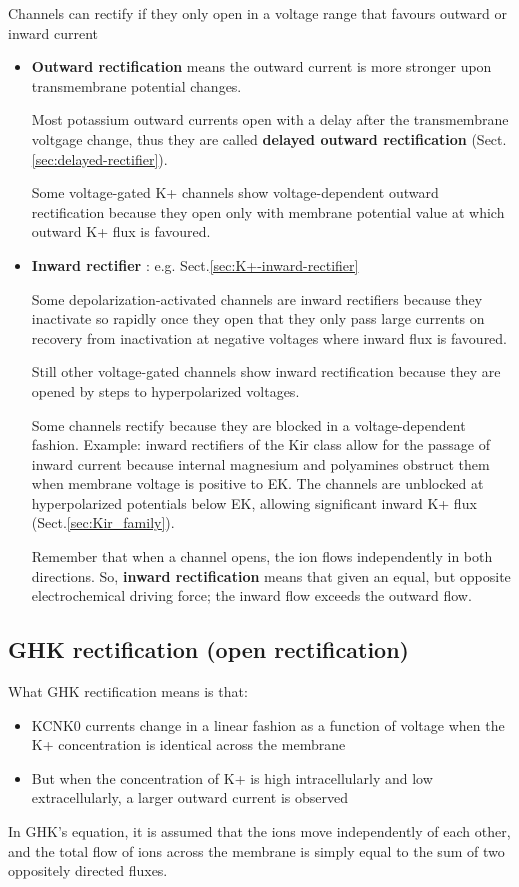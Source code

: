 Channels can rectify if they only open in a voltage range that favours outward
or inward current
\begin{itemize}

  \item {\bf Outward rectification} means the outward current is more stronger
  upon transmembrane potential changes.

Most potassium outward currents open with a delay after the transmembrane
voltgage change, thus they are called {\bf delayed outward rectification}
(Sect.\ref{sec:delayed-rectifier}).

Some voltage-gated K+ channels show voltage-dependent outward rectification
because they open only with membrane potential value at which outward K+
flux is favoured.


  \item {\bf Inward rectifier} : e.g. Sect.\ref{sec:K+-inward-rectifier}

Some depolarization-activated channels are inward rectifiers because they
inactivate so rapidly once they open that they only pass large currents on
recovery from inactivation at negative voltages where inward flux is favoured.

Still other voltage-gated channels show inward rectification because they are
opened by steps to hyperpolarized voltages.

Some channels rectify because they are blocked in a voltage-dependent fashion.
Example: inward rectifiers of the Kir class allow for the passage of inward
current because internal magnesium and polyamines obstruct them when membrane voltage is
positive to EK. The channels are unblocked at hyperpolarized potentials below EK,
allowing significant inward K+ flux (Sect.\ref{sec:Kir_family}).

Remember that when a channel opens, the ion flows independently in both
directions. So, {\bf inward rectification} means that given an equal, but
opposite electrochemical driving force; the inward flow exceeds the outward
flow.

\end{itemize}


\subsection{GHK rectification (open rectification)}
\label{sec:GHK-rectification}
\label{sec:open-rectification}

What GHK rectification means is that:
\begin{itemize}
  \item KCNK0 currents change in a linear fashion as a function of voltage
when the K+ concentration is identical across the membrane

  \item But when the concentration of K+ is high intracellularly and low
  extracellularly, a larger outward current is observed
\end{itemize}
In GHK's equation, it is assumed that the  ions move independently of each
other, and the total flow of ions across the membrane is simply equal to the sum
of two oppositely directed fluxes.

